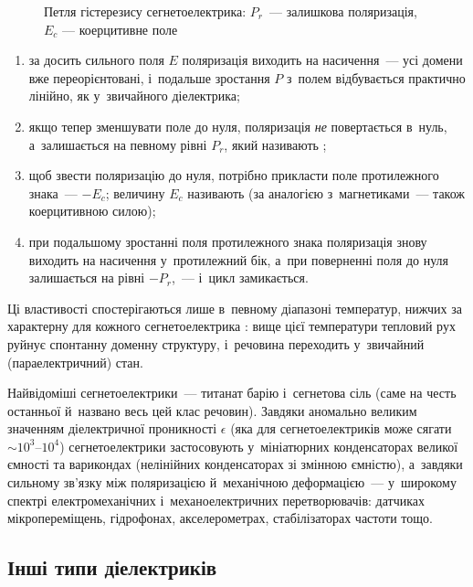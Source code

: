 \begin{figure}[tbp]\centering
	\caption{Петля гістерезису сегнетоелектрика: $P_r$~--- залишкова поляризація, $E_c$
		--- коерцитивне поле\label{pic:HysteresisE}}
\end{figure}
\begin{enumerate}
	\item за досить сильного поля $E$ поляризація виходить на насичення~--- усі домени вже
	      переорієнтовані, і~подальше зростання $P$ з~полем відбувається практично лінійно, як
	      у~звичайного діелектрика;
	\item якщо тепер зменшувати поле до нуля, поляризація \emph{не} повертається в~нуль,
	      а~залишається на певному рівні $P_r$, який називають ;
	\item щоб звести поляризацію до нуля, потрібно прикласти поле протилежного знака~---
	      $-E_c$; величину $E_c$ називають 
	      (за аналогією з~магнетиками~--- також коерцитивною силою);
	\item при подальшому зростанні поля протилежного знака поляризація знову виходить на
	      насичення у~протилежний бік, а~при поверненні поля до нуля залишається на рівні
	      $-P_r$,~--- і~цикл замикається.
\end{enumerate}
Ці властивості спостерігаються лише в~певному діапазоні температур, нижчих за характерну
для кожного сегнетоелектрика : вище цієї
температури тепловий рух руйнує спонтанну доменну структуру, і~речовина переходить
у~звичайний (параелектричний) стан.

Найвідоміші сегнетоелектрики~--- титанат барію  і~сегнетова сіль
 (саме на честь останньої й~названо весь цей клас речовин). Завдяки
аномально великим значенням діелектричної проникності $\epsilon$ (яка для
сегнетоелектриків може сягати $\sim 10^3$--$10^4$) сегнетоелектрики застосовують
у~мініатюрних конденсаторах великої ємності та варикондах (нелінійних конденсаторах зі
змінною ємністю), а~завдяки сильному зв'язку між поляризацією й~механічною деформацією~---
у~широкому спектрі електромеханічних і~механоелектричних перетворювачів: датчиках
мікропереміщень, гідрофонах, акселерометрах, стабілізаторах частоти тощо.


\subsection*{Інші типи діелектриків}\label{sec:PiezoPyro}



